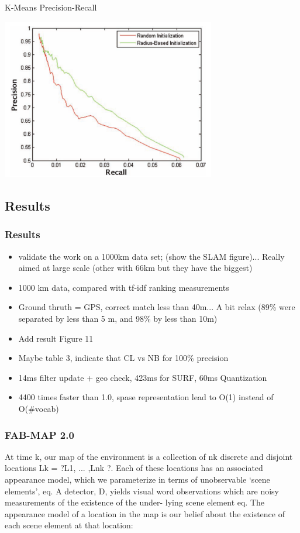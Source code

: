 \begin{frame}[t]{K-Means Precision-Recall}
    \begin{center}
        \includegraphics[width=0.7\textwidth]{./media/precision_recall_kmeans.png}
    \end{center}
\end{frame}

\subsection{Results}
\begin{frame}
    \frametitle{Results}
    \begin{itemize}
        \item validate the work on a 1000km data set; (show the SLAM figure)... Really aimed at large scale (other with 66km but they have the biggest)
        \item 1000 km data, compared with tf-idf ranking measurements
        \item Ground thruth = GPS, correct match less than 40m... A bit relax (89\% were separated by less than 5 m, and 98\% by less than 10m)
        \item Add result Figure 11
        \item Maybe table 3, indicate that CL vs NB for 100\% precision
        \item 14ms filter update + geo check, 423ms for SURF, 60ms Quantization
        \item 4400 times faster than 1.0, spase representation lead to O(1) instead of O(\#vocab)
    \end{itemize}
\end{frame}


\begin{frame}
    \frametitle{FAB-MAP 2.0}
    At time k, our map of the environment is a collection of nk discrete and disjoint locations Lk = ?L1, ... ,Lnk ?. Each of these locations has an associated appearance model, which we parameterize in terms of unobservable ‘scene elements’, eq. A detector, D, yields visual word observations which are noisy measurements of the existence of the under- lying scene element eq. The appearance model of a location in the map is our belief about the existence of each scene element at that location:
\end{frame}

